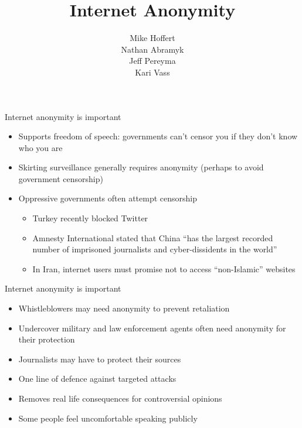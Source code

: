 


\title{Internet Anonymity}
\author[Hoffert, Abramyk, Pereyma, Vass]{Mike Hoffert \\ Nathan Abramyk \\ Jeff Pereyma \\ Kari Vass}



\begin{frame}[plain]
	\titlepage
\end{frame}
\addtocounter{framenumber}{-1}

\begin{frame}[fragile,t]{Internet anonymity is important}
	\begin{itemize}
		\item Supports freedom of speech: governments can't censor you if they don't know who you are
		\item Skirting surveillance generally requires anonymity (perhaps to avoid government censorship)
		\item Oppressive governments often attempt censorship
		\begin{itemize}
			\item Turkey recently blocked Twitter
			\item Amnesty International stated that China ``has the largest recorded number of imprisoned journalists and cyber-dissidents in the world''
			\item In Iran, internet users must promise not to access ``non-Islamic'' websites
		\end{itemize}
	\end{itemize}
\end{frame}

\begin{frame}[fragile,t]{Internet anonymity is important}
	\begin{itemize}
		\item Whistleblowers may need anonymity to prevent retaliation
		\item Undercover military and law enforcement agents often need anonymity for their protection
		\item Journalists may have to protect their sources
		\item One line of defence against targeted attacks
		\item Removes real life consequences for controversial opinions
		\item Some people feel uncomfortable speaking publicly
	\end{itemize}
\end{frame}

